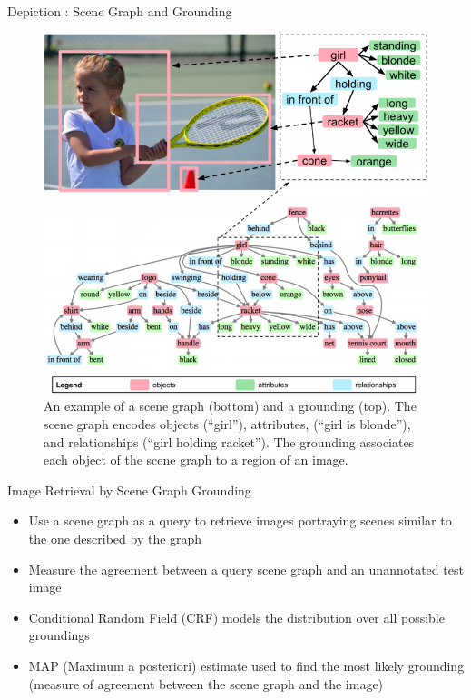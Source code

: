 \documentclass{IFES-beamer}
\begin{document}
    \begin{frame}{Depiction : Scene Graph and Grounding}
        \begin{figure}
            \centering
            \includegraphics[scale=0.22]{Images/scene_graph.png}
            \caption{\cite{Johnson_2015_CVPR}An example of a scene graph (bottom) and a grounding (top). The scene graph encodes objects (“girl”), attributes, (“girl is blonde”), and relationships (“girl holding racket”). The grounding associates each object of the scene graph to a region of an image.}
            \label{fig:my_label}
        \end{figure}
    \end{frame}

    \begin{frame}{Image Retrieval by Scene Graph Grounding}
        \begin{itemize}
            \item Use a scene graph as a query to retrieve images portraying scenes similar to the one described by the graph
            \item Measure the agreement between a query scene graph and an unannotated test image
            \item Conditional Random Field (CRF) models the distribution over all possible groundings
            \item MAP (Maximum a posteriori) estimate used to find the most likely grounding (measure of agreement between the scene graph and the image)
        \end{itemize}
    \end{frame}
    
\end{document}
